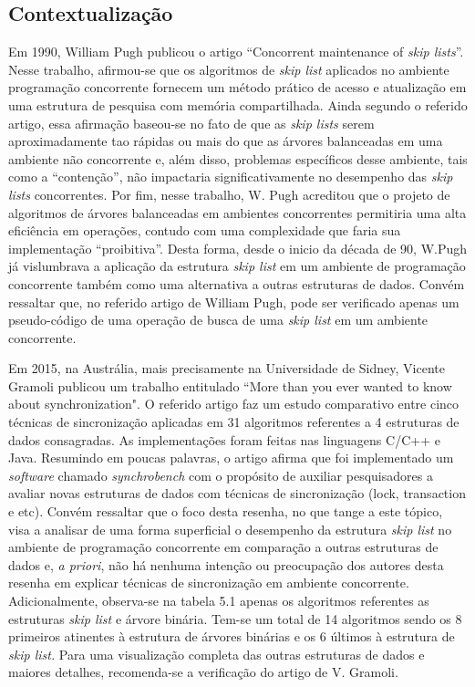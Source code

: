 \documentclass[paper=a4, fontsize=11pt]{scrartcl} %
\numberwithin{equation}{section}
\numberwithin{figure}{section}
\numberwithin{table}{section}
\numberwithin{definition}{section}
\numberwithin{theorem}{section}
\numberwithin{property}{section}
\numberwithin{proposition}{section}
\begin{document}
\subsection{Contextualiza\c{c}\~{a}o}

                  Em 1990, William Pugh publicou o artigo ``Concorrent maintenance of \textit{skip lists}''. Nesse trabalho, afirmou-se que os algoritmos de \textit{skip list} aplicados no ambiente programa\c{c}\~{a}o concorrente fornecem um m\'{e}todo pr\'{a}tico de acesso e atualiza\c{c}\~{a}o em uma estrutura de pesquisa com mem\'{o}ria compartilhada. Ainda segundo o referido artigo, essa afirma\c{c}\~{a}o baseou-se no fato de que as \textit{skip lists} serem aproximadamente tao r\'{a}pidas ou mais do que as \'{a}rvores balanceadas em uma ambiente n\~{a}o concorrente e, al\'{e}m disso, problemas espec\'{i}ficos desse ambiente, tais como a ``conten\c{c}\~{a}o'', n\~{a}o impactaria significativamente no desempenho das \textit{skip lists} concorrentes. Por fim, nesse trabalho, W. Pugh acreditou que o projeto de algoritmos de \'{a}rvores balanceadas em ambientes concorrentes permitiria uma alta efici\^{e}ncia em opera\c{c}\~{o}es, contudo com uma complexidade que faria sua implementa\c{c}\~{a}o ``proibitiva''.  Desta forma, desde o inicio da d\'{e}cada de 90, W.Pugh j\'{a} vislumbrava a aplica\c{c}\~{a}o da estrutura \textit{skip list }em um ambiente de programa\c{c}\~{a}o concorrente tamb\'{e}m como uma alternativa a outras estruturas de dados. Conv\'{e}m ressaltar que, no referido artigo de William Pugh, pode ser verificado apenas um pseudo-c\'{o}digo de uma opera\c{c}\~{a}o de busca de uma \textit{skip list}  em um ambiente concorrente.
                  
  
Em 2015, na Austr\'{a}lia, mais precisamente na Universidade de Sidney, Vicente Gramoli publicou um trabalho entitulado ``More than you ever wanted to know about synchronization". O referido artigo faz um estudo comparativo entre cinco t\'{e}cnicas de sincroniza\c{c}\~{a}o aplicadas em 31 algoritmos referentes a 4 estruturas de dados consagradas. As implementa\c{c}\~{o}es foram feitas nas linguagens C/C++ e Java. Resumindo em poucas palavras, o artigo afirma que foi implementado um \textit{software} chamado \textit{synchrobench} com o prop\'{o}sito de auxiliar pesquisadores a avaliar novas estruturas de dados com t\'{e}cnicas de sincroniza\c{c}\~{a}o (lock, transaction e etc). Conv\'{e}m ressaltar que o foco desta resenha, no que tange a este t\'{o}pico,  visa a analisar de uma forma superficial o desempenho da estrutura \textit{skip list} no ambiente de programa\c{c}\~{a}o concorrente em compara\c{c}\~{a}o a outras estruturas de dados e, \textit{a priori}, n\~{a}o h\'{a} nenhuma inten\c{c}\~{a}o ou preocupa\c{c}\~{a}o dos autores desta resenha em explicar t\'{e}cnicas de  sincroniza\c{c}\~{a}o em ambiente concorrente. Adicionalmente, observa-se na tabela 5.1 apenas os algoritmos referentes as estruturas \textit{skip list} e \'{a}rvore bin\'{a}ria. Tem-se um total de 14 algoritmos sendo os 8 primeiros atinentes \`{a} estrutura de \'{a}rvores bin\'{a}rias e os 6 \'{u}ltimos \`{a} estrutura de \textit{skip list.} Para uma visualiza\c{c}\~{a}o completa das outras estruturas de dados e maiores detalhes, recomenda-se a verifica\c{c}\~{a}o do artigo de V. Gramoli.   
\end{document}
